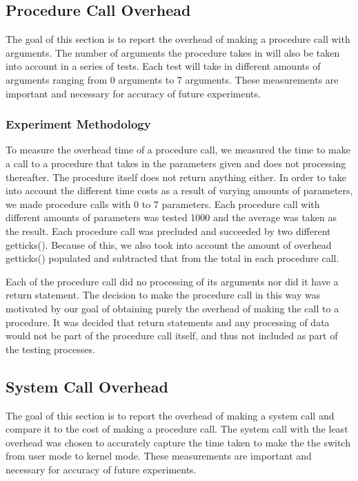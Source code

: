 \documentclass{article} %
\begin{document}
\subsection{Procedure Call Overhead}
The goal of this section is to report the overhead of making a procedure call with arguments. The number of arguments the procedure takes in will also be taken into account in a series of tests. Each test will take in different amounts of arguments ranging from 0 arguments to 7 arguments. These measurements are important and necessary for accuracy of future experiments.

\subsubsection{Experiment Methodology}
To measure the overhead time of a procedure call, we measured the time to make a call to a procedure that takes in the parameters given and does not processing thereafter. The procedure itself does not return anything either. In order to take into account the different time costs as a result of varying amounts of parameters, we made procedure calls with 0 to 7 parameters. Each procedure call with different amounts of parameters was tested 1000 and the average was taken as the result. Each procedure call was precluded and succeeded by two different getticks(). Because of this, we also took into account the amount of overhead getticks() populated and subtracted that from the total in each procedure call. 

Each of the procedure call did no processing of its arguments nor did it have a return statement. The decision to make the procedure call in this way was motivated by our goal of obtaining purely the overhead of making the call to a procedure. It was decided that return statements and any processing of data would not be part of the procedure call itself, and thus not included as part of the testing processes. 

\subsection{System Call Overhead}
The goal of this section is to report the overhead of making a system call and compare it to the cost of making a procedure call. The system call with the least overhead was chosen to accurately capture the time taken to make the the switch from user mode to kernel mode. These measurements are important and necessary for accuracy of future experiments.
\end{document}
